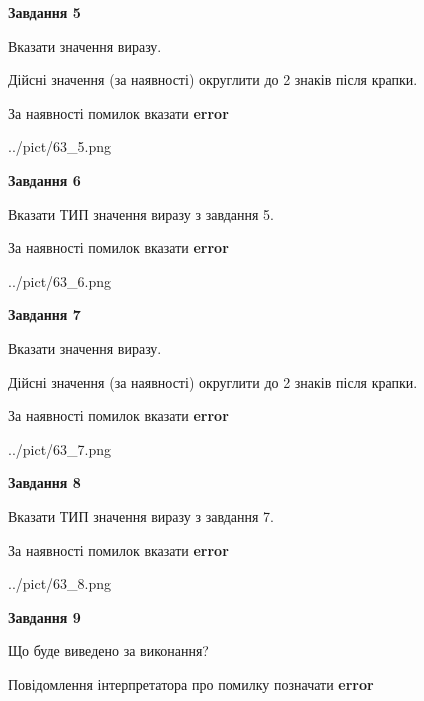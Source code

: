 \documentclass[11pt, ukrainian]{article}
\begin{document}
{\begin {large}
{\begin {center}\textbf{Завдання 5}\end {center}}\par
Вказати значення виразу. \par
Дійсні значення (за наявності) округлити до 2 знаків після крапки. \par
За наявності помилок вказати \textbf{error}

\begin{center}
	{../pict/63_5.png}
\end{center}
\newpage

{\begin {center}\textbf{Завдання 6}\end {center}}\par
Вказати ТИП значення виразу з завдання 5. \par
За наявності помилок вказати \textbf{error}

\begin{center}
	{../pict/63_6.png}
\end{center}
\newpage

{\begin {center}\textbf{Завдання 7}\end {center}}\par
Вказати значення виразу. \par
Дійсні значення (за наявності) округлити до 2 знаків після крапки. \par
За наявності помилок вказати \textbf{error}

\begin{center}
	{../pict/63_7.png}
\end{center}
\newpage

{\begin {center}\textbf{Завдання 8}\end {center}}\par
Вказати ТИП значення виразу з завдання 7. \par
За наявності помилок вказати \textbf{error}

\begin{center}
	{../pict/63_8.png}
\end{center}
\newpage

{\begin {center}\textbf{Завдання 9}\end {center}}\par
Що буде виведено за виконання? \par
Повідомлення інтерпретатора про помилку позначати \textbf{error}


\end{large}}
\end{document}
